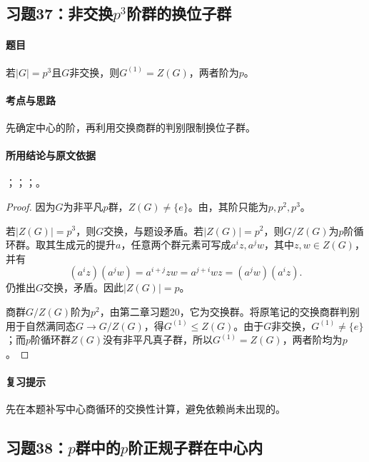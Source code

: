 \subsection{习题37：\texorpdfstring{非交换$p^3$阶群的换位子群}{非交换p3阶群的换位子群}}
\label{ex:2:37}

\paragraph{题目}
若$|G|=p^3$且$G$非交换，则$G^{(1)}=Z(G)$，两者阶为$p$。

\paragraph{考点与思路}
先确定中心的阶，再利用交换商群的判别限制换位子群。

\paragraph{所用结论与原文依据}
；；；。


\begin{proof}
因为$G$为非平凡$p$群，$Z(G)\ne\{e\}$。由，其阶只能为$p,p^2,p^3$。

若$|Z(G)|=p^3$，则$G$交换，与题设矛盾。若$|Z(G)|=p^2$，则$G/Z(G)$为$p$阶循环群。取其生成元的提升$a$，任意两个群元素可写成$a^iz,a^jw$，其中$z,w\in Z(G)$，并有
\[
(a^iz)(a^jw)=a^{i+j}zw=a^{j+i}wz=(a^jw)(a^iz).
\]
仍推出$G$交换，矛盾。因此$|Z(G)|=p$。

商群$G/Z(G)$阶为$p^2$，由第二章习题20，它为交换群。将原笔记的交换商群判别用于自然满同态$G\to G/Z(G)$，得$G^{(1)}\leq Z(G)$。由于$G$非交换，$G^{(1)}\ne\{e\}$；而$p$阶循环群$Z(G)$没有非平凡真子群，所以$G^{(1)}=Z(G)$，两者阶均为$p$。
\end{proof}

\paragraph{复习提示}
先在本题补写中心商循环的交换性计算，避免依赖尚未出现的。


\subsection{习题38：\texorpdfstring{$p$群中的$p$阶正规子群在中心内}{p群中的p阶正规子群在中心内}}
\label{ex:2:38}

